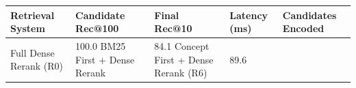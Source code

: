 \begin{tabular}{lllll}
\toprule
Retrieval System & Candidate Rec@100 & Final Rec@10 & Latency (ms) & Candidates Encoded \\
\midrule
Full Dense Rerank (R0) & 100.0%
BM25 First + Dense Rerank & 84.1%
Concept First + Dense Rerank (R6) & 89.6%
\bottomrule
\end{tabular}
